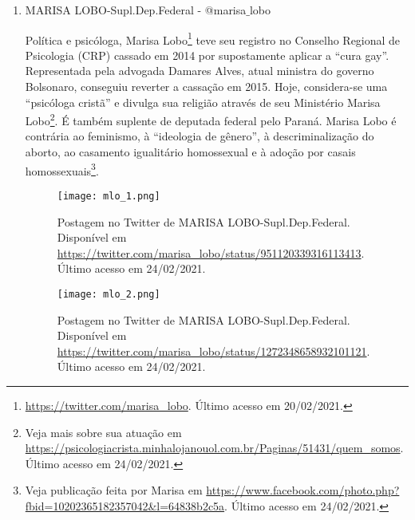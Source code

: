 \documentclass[
	12pt,				%
	openright,			%
	twoside,			%
	a4paper,			%
	english,			%
	brazil				%
	]{abntex2}
\begin{document}
\begin{anexosenv}
\begin{enumerate}
 \begin{figure}[!htbp]
    \centering
    \texttt{[image: ml\_2.png]}
    \caption{Postagem no Twitter de Marcio Labre Oficial. Disponível em \url{https://twitter.com/marciolabre/status/1044959034686795777}. Último acesso em 24/02/2021.}
 \end{figure}
 
  
 \item MARISA LOBO-Supl.Dep.Federal - @marisa$\_$lobo
 
 Política e psicóloga, Marisa Lobo\footnote{\url{https://twitter.com/marisa_lobo}. Último acesso em 20/02/2021.} teve seu registro no Conselho Regional de Psicologia (CRP) cassado em 2014 por supostamente aplicar a ``cura gay''. Representada pela advogada Damares Alves, atual ministra do governo Bolsonaro, conseguiu reverter a cassação em 2015. Hoje, considera-se uma ``psicóloga cristã'' e divulga sua religião através de seu Ministério Marisa Lobo\footnote{Veja mais sobre sua atuação em \url{https://psicologiacrista.minhalojanouol.com.br/Paginas/51431/quem_somos}. Último acesso em 24/02/2021.}. É também suplente de deputada federal pelo Paraná. Marisa Lobo é contrária ao feminismo, à ``ideologia de gênero'', à descriminalização do aborto, ao casamento igualitário homossexual e à adoção por casais homossexuais\footnote{Veja publicação feita por Marisa em \url{https://www.facebook.com/photo.php?fbid=10202365182357042&l=64838b2c5a}. Último acesso em 24/02/2021.}.
 
 \begin{figure}[!htbp]
    \centering
    \texttt{[image: mlo\_1.png]}
    \caption{Postagem no Twitter de MARISA LOBO-Supl.Dep.Federal. Disponível em \url{https://twitter.com/marisa_lobo/status/951120339316113413}. Último acesso em 24/02/2021.}
 \end{figure}
 
 \begin{figure}[!htbp]
    \centering
    \texttt{[image: mlo\_2.png]}
    \caption{Postagem no Twitter de MARISA LOBO-Supl.Dep.Federal. Disponível em \url{https://twitter.com/marisa_lobo/status/1272348658932101121}. Último acesso em 24/02/2021.}
 \end{figure}
 

\end{enumerate}
\end{anexosenv}
\end{document}
